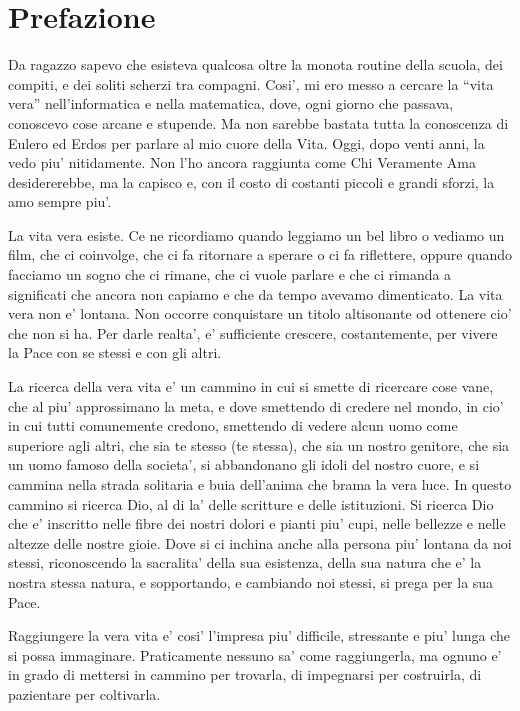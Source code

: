 \chapter{Prefazione}
Da ragazzo sapevo che esisteva qualcosa oltre la monota routine della scuola, dei compiti, e dei soliti scherzi tra compagni. Cosi', mi ero messo a cercare la ``vita vera'' nell'informatica e nella matematica, dove, ogni giorno che passava, conoscevo cose arcane e stupende. Ma non sarebbe bastata tutta la conoscenza di Eulero ed Erdos per parlare al mio cuore della Vita. Oggi, dopo venti anni, la vedo piu' nitidamente. Non l'ho ancora raggiunta come Chi Veramente Ama desidererebbe, ma la capisco e, con il costo di costanti piccoli e grandi sforzi, la amo sempre piu'.

La vita vera esiste. Ce ne ricordiamo quando leggiamo un bel libro o vediamo un film, che ci coinvolge, che ci fa ritornare a sperare o ci fa riflettere, oppure quando facciamo un sogno che ci rimane, che ci vuole parlare e che ci rimanda a significati che ancora non capiamo e che da tempo avevamo dimenticato. La vita vera non e' lontana. Non occorre conquistare un titolo altisonante od ottenere cio' che non si ha. Per darle realta', e' sufficiente crescere, costantemente, per vivere la Pace con se stessi e con gli altri. 

La ricerca della vera vita e' un cammino in cui si smette di ricercare cose vane, che al piu' approssimano la meta, e dove smettendo di credere nel mondo, in cio' in cui tutti comunemente credono, smettendo di vedere alcun uomo come superiore agli altri, che sia te stesso (te stessa), che sia un nostro genitore, che sia un uomo famoso della societa', si abbandonano gli idoli del nostro cuore, e si cammina nella strada solitaria e buia dell'anima che brama la vera luce. In questo cammino si ricerca Dio, al di la' delle scritture e delle istituzioni. Si ricerca Dio che e' inscritto nelle fibre dei nostri dolori e pianti piu' cupi, nelle bellezze e nelle altezze delle nostre gioie. Dove si ci inchina anche alla persona piu' lontana da noi stessi, riconoscendo la sacralita' della sua esistenza, della sua natura che e' la nostra stessa natura, e sopportando, e cambiando noi stessi, si prega per la sua Pace.

Raggiungere la vera vita e' cosi' l'impresa piu' difficile, stressante e piu' lunga che si possa immaginare. Praticamente nessuno sa' come raggiungerla, ma ognuno e' in grado di mettersi in cammino per trovarla, di impegnarsi per costruirla, di pazientare per coltivarla.

